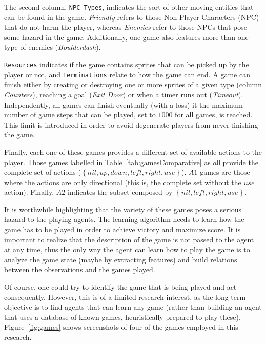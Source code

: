 \documentclass[conference]{IEEEtran}
\begin{document}
The second column, \texttt{NPC Types}, indicates the sort of other moving entities that can be found in the game. \textit{Friendly} refers to those Non Player Characters (NPC) that do not harm the player, whereas \textit{Enemies} refer to those NPCs that pose some hazard in the game. Additionally, one game also features more than one type of enemies (\textit{Boulderdash}).

\texttt{Resources} indicates if the game contains sprites that can be picked up by the player or not, and \texttt{Terminations} relate to how the game can end. A game can finish either by creating or destroying one or more sprites of a given type (column \textit{Counters}), reaching a goal (\textit{Exit Door}) or when a timer runs out (\textit{Timeout}). Independently, all games can finish eventually (with a loss) it the maximum number of game steps that can be played, set to $1000$ for all games, is reached. This limit is introduced in order to avoid degenerate players from never finishing the game.

Finally, each one of these games provides a different set of available actions to the player. Those games labelled in Table~\ref{tab:gamesComparative} as $a0$ provide the complete set of actions ($\left \{ nil, up, down, left, right, use \right \}$). $A1$ games are those where the actions are only directional (this is, the complete set without the $use$ action). Finally, $A2$ indicates the subset composed by $\left \{ nil, left, right, use \right \}$.

It is worthwhile highlighting that the variety of these games poses a serious hazard to the playing agents. The learning algorithm needs to learn how the game has to be played in order to achieve victory and maximize score. It is important to realize that the description of the game is not passed to the agent at any time, thus the only way the agent can learn how to play the game is to analyze the game state (maybe by extracting features) and build relations between the observations and the games played.

Of course, one could try to identify the game that is being played and act consequently. However, this is of a limited research interest, as the long term objective is to find agents that can learn any game (rather than building an agent that uses a database of known games, heuristically prepared to play these).  Figure~\ref{fig:games} shows screenshots of four of the games employed in this research.
\end{document}
